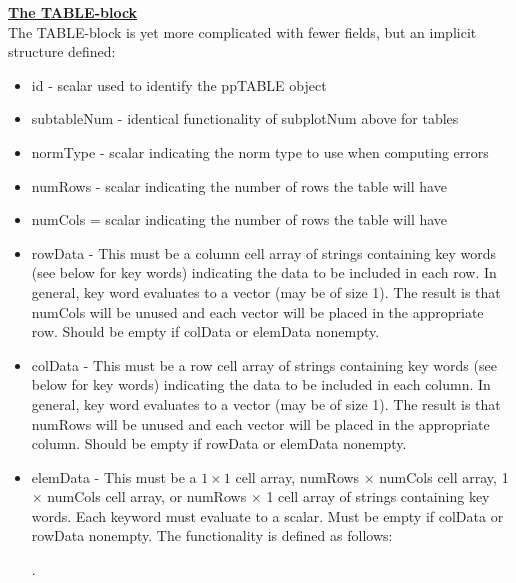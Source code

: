 \documentclass[notitlepage]{report}
\begin{document}
\vspace{2mm}
\noindent \underline{\textbf{The TABLE-block}} \\
The TABLE-block is yet more complicated with fewer fields, but an implicit structure defined:
\begin{itemize}
       \item id - scalar used to identify the ppTABLE object
       \item subtableNum - identical functionality of subplotNum above for tables
       \item normType - scalar indicating the norm type to use when computing errors
       \item numRows - scalar indicating the number of rows the table will have
       \item numCols = scalar indicating the number of rows the table will have
       \item rowData - This must be a column cell array of strings containing key words (see below for key words) indicating the data to be included in each row.  In general, key word evaluates to a vector (may be of size 1).  The result is that numCols will be unused and each vector will be placed in the appropriate row.  Should be empty if colData or elemData nonempty.
       \item colData -  This must be a row cell array of strings containing key words (see below for key words) indicating the data to be included in each column.  In general, key word evaluates to a vector (may be of size 1).  The result is that numRows will be unused and each vector will be placed in the appropriate column.  Should be empty if rowData or elemData nonempty.
       \item elemData -  This must be a $1 \times 1$ cell array, numRows $\times$ numCols cell array,  1 $\times$ numCols cell array, or numRows $\times$ 1 cell array of strings containing key words.  Each keyword must evaluate to a scalar.  Must be empty if colData or rowData nonempty.  The functionality is defined as follows: .

\end{itemize}
\end{document}
